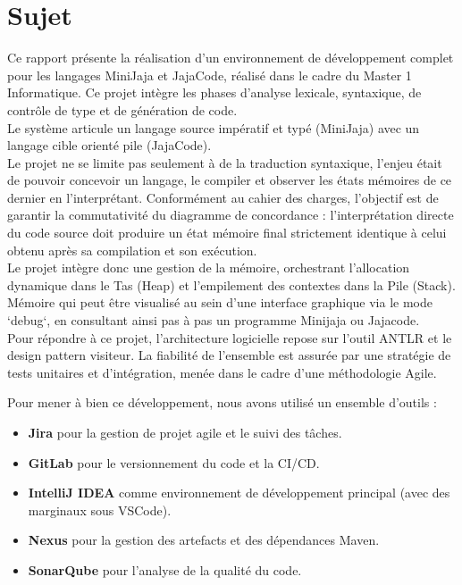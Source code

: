 \section{Sujet}

Ce rapport présente la réalisation d'un environnement de développement complet pour les langages MiniJaja et JajaCode, réalisé dans le cadre du Master 1 Informatique. Ce projet intègre les phases d'analyse lexicale, syntaxique, de contrôle de type et de génération de code.\\

Le système articule un langage source impératif et typé (MiniJaja) avec un langage cible orienté pile (JajaCode).\\

Le projet ne se limite pas seulement à de la traduction syntaxique, l'enjeu était de pouvoir concevoir un langage, le compiler et observer les états mémoires de ce dernier en l'interprétant. Conformément au cahier des charges, l'objectif est de garantir la commutativité du diagramme de concordance : l'interprétation directe du code source doit produire un état mémoire final strictement identique à celui obtenu après sa compilation et son exécution.\\

Le projet intègre donc une gestion de la mémoire, orchestrant l'allocation dynamique dans le Tas (Heap) et l'empilement des contextes dans la Pile (Stack).\\

Mémoire qui peut être visualisé au sein d'une interface graphique via le mode `debug`, en consultant ainsi pas à pas un programme Minijaja ou Jajacode.\\

Pour répondre à ce projet, l'architecture logicielle repose sur l'outil ANTLR et le design pattern visiteur. La fiabilité de l'ensemble est assurée par une stratégie de tests unitaires et d'intégration, menée dans le cadre d'une méthodologie Agile.

Pour mener à bien ce développement, nous avons utilisé un ensemble d'outils :
\begin{itemize}
    \item \textbf{Jira} pour la gestion de projet agile et le suivi des tâches.
    \item \textbf{GitLab} pour le versionnement du code et la CI/CD.
    \item \textbf{IntelliJ IDEA} comme environnement de développement principal (avec des marginaux sous VSCode).
    \item \textbf{Nexus} pour la gestion des artefacts et des dépendances Maven.
    \item \textbf{SonarQube} pour l'analyse de la qualité du code.
\end{itemize}

